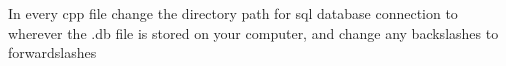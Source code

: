 In every cpp file change the directory path for sql database connection to wherever the .db file is stored on your computer, and change any backslashes to forwardslashes 
